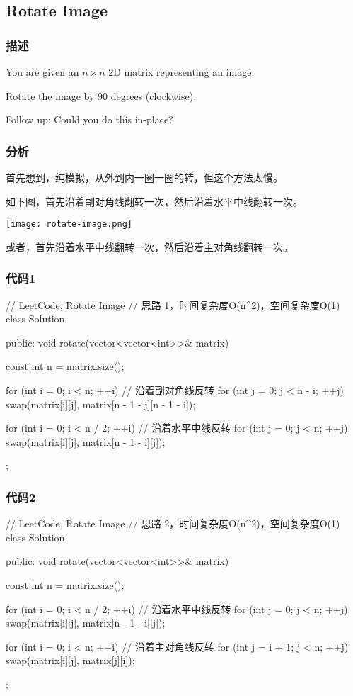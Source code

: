 \subsection{Rotate Image} %
\label{sec:rotate-image}


\subsubsection{描述}
You are given an $n \times n$ 2D matrix representing an image.

Rotate the image by 90 degrees (clockwise).

Follow up:
Could you do this in-place?


\subsubsection{分析}
首先想到，纯模拟，从外到内一圈一圈的转，但这个方法太慢。

如下图，首先沿着副对角线翻转一次，然后沿着水平中线翻转一次。

\begin{center}
	\texttt{[image: rotate-image.png]}\\
	\label{fig:rotate-image}
\end{center}

或者，首先沿着水平中线翻转一次，然后沿着主对角线翻转一次。


\subsubsection{代码1}
\begin{Code}
	// LeetCode, Rotate Image
	// 思路 1，时间复杂度O(n^2)，空间复杂度O(1)
	class Solution {
		public:
		void rotate(vector<vector<int>>& matrix) {
			const int n = matrix.size();
			
			for (int i = 0; i < n; ++i)  // 沿着副对角线反转
			for (int j = 0; j < n - i; ++j)
			swap(matrix[i][j], matrix[n - 1 - j][n - 1 - i]);
			
			for (int i = 0; i < n / 2; ++i) // 沿着水平中线反转
			for (int j = 0; j < n; ++j)
			swap(matrix[i][j], matrix[n - 1 - i][j]);
		}
	};
\end{Code}

\subsubsection{代码2}
\begin{Code}
	// LeetCode, Rotate Image
	// 思路 2，时间复杂度O(n^2)，空间复杂度O(1)
	class Solution {
		public:
		void rotate(vector<vector<int>>& matrix) {
			const int n = matrix.size();
			
			for (int i = 0; i < n / 2; ++i) // 沿着水平中线反转
			for (int j = 0; j < n; ++j)
			swap(matrix[i][j], matrix[n - 1 - i][j]);
			
			for (int i = 0; i < n; ++i)  // 沿着主对角线反转
			for (int j = i + 1; j < n; ++j)
			swap(matrix[i][j], matrix[j][i]);
		}
	};
\end{Code}


